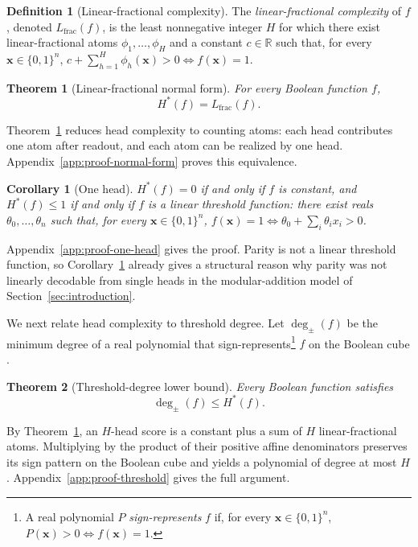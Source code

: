 \documentclass{article}
\newtheorem{theorem}{Theorem}
\theoremstyle{definition}
\newtheorem{definition}{Definition}
\theoremstyle{plain}
\newtheorem{corollary}{Corollary}
\newcommand{\hstar}{H^{\ast}}
\newcommand{\tdeg}{\deg_{\pm}}
\newcommand{\bits}{\{0,1\}}
\begin{document}
\begin{definition}[Linear-fractional complexity]
\label{def:lfrac}The \emph{linear-fractional complexity} of $f$, denoted $L_{\mathrm{frac}}(f)$, is the least nonnegative integer $H$ for which there exist linear-fractional atoms $\phi_1,\ldots,\phi_H$ and a constant $c\in\mathbb{R}$ such that, for every $\mathbf{x}\in\bits^n$, $c+\sum_{h=1}^{H}\phi_h(\mathbf{x})>0 \Longleftrightarrow f(\mathbf{x})=1$.
\end{definition}
\smallskip

\begin{theorem}[Linear-fractional normal form]
\label{thm:normal-form}
For every Boolean function $f$,
\begin{equation*}
\hstar(f)=L_{\mathrm{frac}}(f).
\end{equation*}
\end{theorem}
Theorem~\ref{thm:normal-form} reduces head complexity to counting atoms: each head contributes one atom after readout, and each atom can be realized by one head. Appendix~\ref{app:proof-normal-form} proves this equivalence.

\begin{corollary}[One head]
\label{cor:one-head}
$\hstar(f)=0$ if and only if $f$ is constant, and $\hstar(f)\leq1$ if and only if $f$ is a linear threshold function: there exist reals $\theta_0,\ldots,\theta_n$ such that, for every $\mathbf{x}\in\bits^n$, $f(\mathbf{x})=1 \Longleftrightarrow \theta_0+\sum_i\theta_ix_i>0$.
\end{corollary}
Appendix~\ref{app:proof-one-head} gives the proof. Parity is not a linear threshold function, so Corollary~\ref{cor:one-head} already gives a structural reason why parity was not linearly decodable from single heads in the modular-addition model of Section~\ref{sec:introduction}.

We next relate head complexity to threshold degree. Let $\tdeg(f)$ be the minimum degree of a real polynomial that sign-represents\footnote{A real polynomial $P$ \emph{sign-represents} $f$ if, for every $\mathbf{x}\in\bits^n$, $P(\mathbf{x})>0 \Longleftrightarrow f(\mathbf{x})=1$.} $f$ on the Boolean cube \citep{minsky1969perceptrons}.

\begin{theorem}[Threshold-degree lower bound]
\label{thm:threshold}
Every Boolean function satisfies
\begin{equation*}
\tdeg(f)\leq\hstar(f).
\end{equation*}
\end{theorem}
By Theorem~\ref{thm:normal-form}, an $H$-head score is a constant plus a sum of $H$ linear-fractional atoms. Multiplying by the product of their positive affine denominators preserves its sign pattern on the Boolean cube and yields a polynomial of degree at most $H$. Appendix~\ref{app:proof-threshold} gives the full argument.
\end{document}
